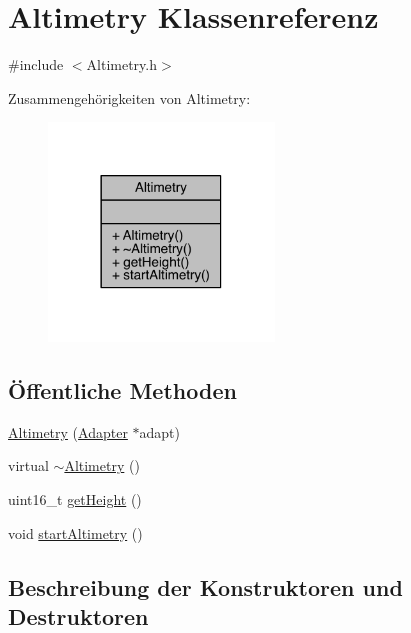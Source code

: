 \hypertarget{class_altimetry}{}\section{Altimetry Klassenreferenz}
\label{class_altimetry}


{\ttfamily \#include $<$Altimetry.\+h$>$}



Zusammengehörigkeiten von Altimetry\+:\nopagebreak
\begin{figure}[H]
\begin{center}
\leavevmode
\includegraphics[width=170pt]{class_altimetry__coll__graph}
\end{center}
\end{figure}
\subsection*{Öffentliche Methoden}
\begin{DoxyCompactItemize}
\item 
\hyperlink{class_altimetry_a1a9cb83c86405f07f1bc98ee0d22d65f}{Altimetry} (\hyperlink{class_adapter}{Adapter} $\ast$adapt)
\item 
virtual \hyperlink{class_altimetry_a242b63ebcecf578d9cbc0b80d30bbc2f}{$\sim$\+Altimetry} ()
\item 
uint16\+\_\+t \hyperlink{class_altimetry_a502ab1622b12f938ca61dc40d6a15e07}{get\+Height} ()
\item 
void \hyperlink{class_altimetry_acf39bd22b3d28f8bd41828d2faec3440}{start\+Altimetry} ()
\end{DoxyCompactItemize}


\subsection{Beschreibung der Konstruktoren und Destruktoren}
\hypertarget{class_altimetry_a1a9cb83c86405f07f1bc98ee0d22d65f}{}\label{class_altimetry_a1a9cb83c86405f07f1bc98ee0d22d65f} 
